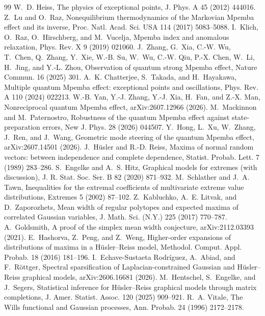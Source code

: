 \documentclass[11pt]{article}
\theoremstyle{definition}
\begin{document}
\begin{thebibliography}{99}
 W.~D. Heiss, The physics of exceptional points, J. Phys. A 45 (2012) 444016.
 Z.~Lu and O.~Raz, Nonequilibrium thermodynamics of the Markovian Mpemba effect and its inverse, Proc. Natl. Acad. Sci. USA 114 (2017) 5083--5088.
 I.~Klich, O.~Raz, O.~Hirschberg, and M.~Vucelja, Mpemba index and anomalous relaxation, Phys. Rev. X 9 (2019) 021060.
 J.~Zhang, G.~Xia, C.-W. Wu, T.~Chen, Q.~Zhang, Y.~Xie, W.-B. Su, W.~Wu, C.-W. Qiu, P.-X. Chen, W.~Li, H.~Jing, and Y.-L. Zhou, Observation of quantum strong Mpemba effect, Nature Commun. 16 (2025) 301.
 A.~K. Chatterjee, S.~Takada, and H.~Hayakawa, Multiple quantum Mpemba effect: exceptional points and oscillations, Phys. Rev. A 110 (2024) 022213.
 W.-B. Yan, Y.-J. Zhang, Y.-J. Xia, H.~Fan, and Z.-X. Man, Nonreciprocal quantum Mpemba effect, arXiv:2607.12966 (2026).
 M.~Mackinnon and M.~Paternostro, Robustness of the quantum Mpemba effect against state-preparation errors, New J. Phys. 28 (2026) 044507.
 Y.~Hong, L.~Xu, W.~Zhang, J.~Ren, and J.~Wang, Geometric mode steering of the quantum Mpemba effect, arXiv:2607.14501 (2026).
 J.~H\"usler and R.-D. Reiss, Maxima of normal random vectors: between independence and complete dependence, Statist. Probab. Lett. 7 (1989) 283--286.
 S.~Engelke and A.~S. Hitz, Graphical models for extremes (with discussion), J. R. Stat. Soc. Ser. B 82 (2020) 871--932.
 M.~Schlather and J.~A. Tawn, Inequalities for the extremal coefficients of multivariate extreme value distributions, Extremes 5 (2002) 87--102.
 Z.~Kabluchko, A.~E. Litvak, and D.~Zaporozhets, Mean width of regular polytopes and expected maxima of correlated Gaussian variables, J. Math. Sci. (N.Y.) 225 (2017) 770--787.
 A.~Goldsmith, A proof of the simplex mean width conjecture, arXiv:2112.03393 (2021).
 E.~Hashorva, Z.~Peng, and Z.~Weng, Higher-order expansions of distributions of maxima in a H\"usler--Reiss model, Methodol. Comput. Appl. Probab. 18 (2016) 181--196.
 I.~Echave-Sustaeta Rodr\'iguez, A.~Abiad, and F.~R\"ottger, Spectral sparsification of Laplacian-constrained Gaussian and H\"usler--Reiss graphical models, arXiv:2606.16681 (2026).
 M.~Hentschel, S.~Engelke, and J.~Segers, Statistical inference for H\"usler--Reiss graphical models through matrix completions, J. Amer. Statist. Assoc. 120 (2025) 909--921.
 R.~A. Vitale, The Wills functional and Gaussian processes, Ann. Probab. 24 (1996) 2172--2178.

\end{thebibliography}
\end{document}
